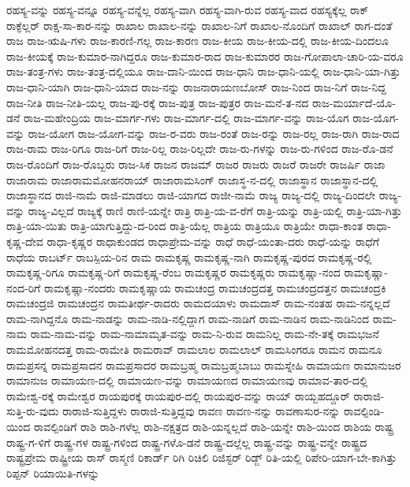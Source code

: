 {ರಹಸ್ಯ-ವನ್ನು
ರಹಸ್ಯ-ವನ್ನೂ
ರಹಸ್ಯ-ವನ್ನೆಲ್ಲ
ರಹಸ್ಯ-ವಾಗಿ
ರಹಸ್ಯ-ವಾಗಿ-ರುವ
ರಹಸ್ಯ-ವಾದ
ರಹಸ್ಯಕ್ಕೆಲ್ಲ
ರಾಕ್
ರಾಕ್ಫೆಲ್ಲರ್
ರಾಕ್ಷ-ಸಾ-ಕಾರ-ನನ್ನು
ರಾಖಾಲ
ರಾಖಾಲ-ನನ್ನು
ರಾಖಾಲ-ನಿಗೆ
ರಾಖಾಲ-ನೊಂದಿಗೆ
ರಾಖಾಲ್
ರಾಗ-ದಂತೆ
ರಾಜ
ರಾಜ-ಋಷಿ-ಗಳು
ರಾಜ-ಕಾರಣಿ-ಗಲ್ಲ
ರಾಜ-ಕಾರಣ
ರಾಜ-ಕೀಯ
ರಾಜ-ಕೀಯ-ದಲ್ಲಿ
ರಾಜ-ಕೀಯ-ದಿಂದಲೂ
ರಾಜ-ಕೀಯಕ್ಕೆ
ರಾಜ-ಕುಮಾರ-ನಾಗಿದ್ದರೂ
ರಾಜ-ಕುಮಾರ-ರಾದ
ರಾಜ-ಕುಮಾರರ
ರಾಜ-ಗೋಪಾಲಾ-ಚಾರಿ-ಯ-ವರೂ
ರಾಜ-ತಂತ್ರ-ಗಳು
ರಾಜ-ತಂತ್ರ-ದಲ್ಲಿಯೂ
ರಾಜ-ದಾನಿ-ಯಿಂದ
ರಾಜ-ಧಾನಿ
ರಾಜ-ಧಾನಿ-ಯಲ್ಲಿ
ರಾಜ-ಧಾನಿ-ಯಾ-ಗಿತ್ತು
ರಾಜ-ಧಾನಿ-ಯಾಗಿ
ರಾಜ-ಧಾನಿ-ಯಾದ
ರಾಜ-ನನ್ನು
ರಾಜನಾರಾಯಣಬೋಸ್
ರಾಜ-ನಿಂದ
ರಾಜ-ನಿಗೆ
ರಾಜ-ನಿದ್ದ
ರಾಜ-ನೀತಿ
ರಾಜ-ನೀತಿ-ಯಲ್ಲ
ರಾಜ-ಪು-ರಕ್ಕೆ
ರಾಜ-ಪುತ್ರ
ರಾಜ-ಪುತ್ರರ
ರಾಜ-ಮನೆ-ತ-ನದ
ರಾಜ-ಮರ್ಯಾದೆ-ಯೊ-ಡನೆ
ರಾಜ-ಮಹೇಂದ್ರಿಯ
ರಾಜ-ಮಾರ್ಗ-ಗಳು
ರಾಜ-ಮಾರ್ಗ-ದಲ್ಲಿ
ರಾಜ-ಮಾರ್ಗ-ವನ್ನು
ರಾಜ-ಯೊಗ
ರಾಜ-ಯೊಗ-ವನ್ನು
ರಾಜ-ಯೋಗ
ರಾಜ-ಯೋಗ-ವನ್ನು
ರಾಜ-ರ-ವರು
ರಾಜ-ರಂತೆ
ರಾಜ-ರನ್ನು
ರಾಜ-ರಲ್ಲ
ರಾಜ-ರಾಗಿ
ರಾಜ-ರಾದ
ರಾಜ-ರಾಮ
ರಾಜ-ರಿಗೂ
ರಾಜ-ರಿಗೆ
ರಾಜ-ರಿಲ್ಲ
ರಾಜ-ರಿಲ್ಲದೇ
ರಾಜ-ರು-ಗಳನ್ನು
ರಾಜ-ರು-ಗಳಿಂದ
ರಾಜ-ರೊ-ಡನೆ
ರಾಜ-ರೊಂದಿಗೆ
ರಾಜ-ರೊಬ್ಬರು
ರಾಜ-ಸಿಕ
ರಾಜನ
ರಾಜಮ್
ರಾಜರ
ರಾಜರು
ರಾಜರೆ
ರಾಜರೇ
ರಾಜರ್ಷಿ
ರಾಜಾ
ರಾಜಾರಾಮ
ರಾಜಾರಾಮಮೋಹನರಾಯ್
ರಾಜಾರಾಮಸಿಂಗ್
ರಾಜಾಸ್ಥ-ನ-ದಲ್ಲಿ
ರಾಜಾಸ್ಥಾನ
ರಾಜಾಸ್ಥಾನ-ದಲ್ಲಿ
ರಾಜಾಸ್ಥಾನದ
ರಾಜಿ-ನಾಮೆ
ರಾಜಿ-ಮಾಡಲು
ರಾಜಿ-ಯಾಗದ
ರಾಜೀ-ನಾಮೆ
ರಾಜ್ಯ
ರಾಜ್ಯ-ದಲ್ಲಿ
ರಾಜ್ಯ-ದಿಂದಲೇ
ರಾಜ್ಯ-ವನ್ನು
ರಾಜ್ಯ-ವಿಲ್ಲದೆ
ರಾಜ್ಯಕ್ಕೆ
ರಾಣಿ
ರಾಣಿ-ಯನ್ನೇ
ರಾತ್ರಿ
ರಾತ್ರಿ-ಯ-ವ-ರೆಗೆ
ರಾತ್ರಿ-ಯನ್ನು
ರಾತ್ರಿ-ಯಲ್ಲಿ
ರಾತ್ರಿ-ಯಾ-ಗಿತ್ತು
ರಾತ್ರಿ-ಯಾ-ಯಿತು
ರಾತ್ರಿ-ಯಾಗುತ್ತಿದ್ದು-ದ-ರಿಂದ
ರಾತ್ರಿ-ಯೆಲ್ಲ
ರಾತ್ರಿಯ
ರಾತ್ರಿಯೂ
ರಾತ್ರಿಯೇ
ರಾಧಾ-ಕಾಂತ
ರಾಧಾ-ಕೃಷ್ಣ-ದೇವ
ರಾಧಾ-ಕೃಷ್ಣರ
ರಾಧಾಕುಂಡದ
ರಾಧಾಪ್ರೇಮ-ವನ್ನು
ರಾಧೆ
ರಾಧೆ-ಯಂತಾ-ದರು
ರಾಧೆ-ಯನ್ನು
ರಾಧೆಗೆ
ರಾಧೆಯ
ರಾಬರ್ಟ್
ರಾಬಸ್ಪಿಯ-ರಿನ
ರಾಮ
ರಾಮಕೃಷ್ಣ
ರಾಮಕೃಷ್ಣ-ನಾಗಿ
ರಾಮಕೃಷ್ಣ-ಪುರದ
ರಾಮಕೃಷ್ಣ-ರಲ್ಲಿ
ರಾಮಕೃಷ್ಣ-ರಿಗೂ
ರಾಮಕೃಷ್ಣ-ರಿಗೆ
ರಾಮಕೃಷ್ಣ-ರೆಂಬ
ರಾಮಕೃಷ್ಣರ
ರಾಮಕೃಷ್ಣರು
ರಾಮಕೃಷ್ಣಾ-ನಂದ
ರಾಮಕೃಷ್ಣಾ-ನಂದ-ರಿಗೆ
ರಾಮಕೃಷ್ಣಾ-ನಂದರು
ರಾಮಕೃಷ್ಣಾಯ
ರಾಮಚಂದ್ರ
ರಾಮಚಂದ್ರದತ್ತ
ರಾಮಚಂದ್ರದತ್ತನ
ರಾಮಚಂದ್ರಕಿ
ರಾಮಚಂದ್ರಜಿ
ರಾಮಚಂದ್ರನ
ರಾಮತೀರ್ಥ-ರಾದರು
ರಾಮದಯಾಳು
ರಾಮದಾಸ್
ರಾಮ-ನಂತಹ
ರಾಮ-ನನ್ನಲ್ಲದೆ
ರಾಮ-ನಾಗಿದ್ದನೊ
ರಾಮ-ನಾಡನ್ನು
ರಾಮ-ನಾಡಿ-ನಲ್ಲಿದ್ದಾಗ
ರಾಮ-ನಾಡಿಗೆ
ರಾಮ-ನಾಡಿನ
ರಾಮ-ನಾಡಿನಿಂದ
ರಾಮ-ನಾಮ
ರಾಮ-ನಾಮ-ವನ್ನು
ರಾಮ-ನಾಮಾಮೃತ-ವನ್ನು
ರಾಮ-ನಿ-ರುವ
ರಾಮನಿಲ್ಲ
ರಾಮ-ನೇ-ತಕ್ಕೆ
ರಾಮಭಜನೆ
ರಾಮಮೋಹನದತ್ತ
ರಾಮ-ರಾಮೇತಿ
ರಾಮರಾವ್
ರಾಮಲಾಲ
ರಾಮಲಾಲ್
ರಾಮಸಿಂಗರೂ
ರಾಮನ
ರಾಮನೂ
ರಾಮಪ್ರಸನ್ನ
ರಾಮಪ್ರಸಾದನ
ರಾಮಪ್ರಸಾದರ
ರಾಮಬ್ರಹ್ಮ
ರಾಮಬ್ರಹ್ಮಬಾಬು
ರಾಮಸ್ನೇಹಿ
ರಾಮಾಯಣ
ರಾಮಾನುಜರ
ರಾಮಾನುಜ
ರಾಮಾಯಣ-ದಲ್ಲಿ
ರಾಮಾಯಣ-ವನ್ನು
ರಾಮಾಯಣದ
ರಾಮಾಯಣವು
ರಾಮಾವ-ತಾರ-ದಲ್ಲಿ
ರಾಮೇಶ್ವ-ರಕ್ಕೆ
ರಾಮೇಶ್ವರ
ರಾಯಪುರಕ್ಕೆ
ರಾಯಪುರ-ದಲ್ಲಿ
ರಾಯಪುರ-ವನ್ನು
ರಾಯ್
ರಾಯ್ಬಹದ್ದೂರ್
ರಾರಾಜಿ-ಸುತ್ತಿ-ರು-ವುದು
ರಾರಾಜಿ-ಸುತ್ತಿದ್ದಳು
ರಾರಾಜಿ-ಸುತ್ತಿದ್ದವು
ರಾವಣ
ರಾವಣ-ನನ್ನು
ರಾವಣಾಸುರ-ನನ್ನು
ರಾವಲ್ಪಿಂಡಿ-ಯಿಂದ
ರಾವಲ್ಪಿಂಡಿಗೆ
ರಾಶಿ
ರಾಶಿ-ಗಳೆಲ್ಲ
ರಾಶಿ-ನಕ್ಷತ್ರದ
ರಾಶಿ-ಯನ್ನಲ್ಲದೆ
ರಾಶಿ-ಯನ್ನೇ
ರಾಶಿ-ಯಿಂದ
ರಾಶಿಯ
ರಾಷ್ಟ್ರ
ರಾಷ್ಟ್ರ-ಗ-ಳಿಗೆ
ರಾಷ್ಟ್ರ-ಗಳ
ರಾಷ್ಟ್ರ-ಗಳಿಂದ
ರಾಷ್ಟ್ರ-ಗಳೊ-ಡನೆ
ರಾಷ್ಟ್ರ-ದಲ್ಲೆಲ್ಲ
ರಾಷ್ಟ್ರ-ವನ್ನು
ರಾಷ್ಟ್ರ-ವನ್ನೇ
ರಾಷ್ಟ್ರದ
ರಾಷ್ಟ್ರಪ್ರೇಮ
ರಾಷ್ಟ್ರೀಯ
ರಾಸ್
ರಾಸ್ಮಣಿ
ರಿಕಾರ್ಡ್
ರಿಗಿ
ರಿಚಿಲಿ
ರಿಜಿಸ್ಟರ್
ರಿಡ್ಜ್
ರಿತಿ-ಯಲ್ಲಿ
ರಿಪೇರಿ-ಯಾಗ-ಬೇ-ಕಾಗಿತ್ತು
ರಿಪ್ಪನ್
ರಿಯಾಯಿತಿ-ಗಳನ್ನು
}
